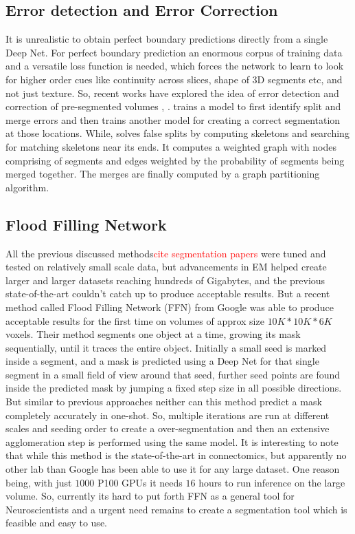 \subsection{Error detection and Error Correction}
It is unrealistic to obtain perfect boundary predictions directly from a single Deep Net. For perfect boundary prediction an enormous corpus of training data and a versatile loss function is needed, which forces the network to learn to look for higher order cues like continuity across slices, shape of 3D segments etc, and not just texture. So, recent works have explored the idea of error detection and correction of pre-segmented volumes \cite{Seung2017}, \cite{Brain2019}. \cite{Seung2017} trains a model to first identify split and merge errors and then trains another model for creating a correct segmentation at those locations. While, \cite{Brain2019} solves false splits by computing skeletons and searching for matching skeletons near its ends. It computes a weighted graph with nodes comprising of segments and edges weighted by the probability of segments being merged together. The merges are finally computed by a graph partitioning algorithm.

\subsection{Flood Filling Network}
All the previous discussed methods\textcolor{red}{cite segmentation papers}  were tuned and tested on relatively small scale data, but advancements in EM helped create larger and larger datasets reaching hundreds of Gigabytes, and the previous state-of-the-art couldn't catch up to produce acceptable results. But a recent method called Flood Filling Network (FFN) \cite{Januszewski2018FFN} from Google was able to produce acceptable results for the first time on volumes of approx size $10K*10K*6K$ voxels.
Their method segments one object at a time, growing its mask sequentially, until it traces the entire object. Initially a small seed is marked inside a segment, and a mask is predicted using a Deep Net for that single segment in a small field of view around that seed, further seed points are found inside the predicted mask by jumping a fixed step size in all possible directions.
But similar to previous approaches neither can this method predict a mask completely accurately in one-shot. So, multiple iterations are run at different scales and seeding order to create a over-segmentation and then an extensive agglomeration step is performed using the same model.
It is interesting to note that while this method is the state-of-the-art in connectomics, but apparently no other lab than Google has been able to use it for any large dataset. One reason being, with just $1000$ P100 GPUs it needs $16$ hours to run inference on the large volume\cite{Januszewski2017FFN}. So, currently its hard to put forth FFN as a general tool for Neuroscientists and a urgent need remains to create a segmentation tool which is feasible and easy to use.

